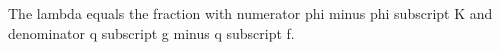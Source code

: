 The lambda equals the fraction with numerator phi minus phi subscript K and denominator q subscript g minus q subscript f.